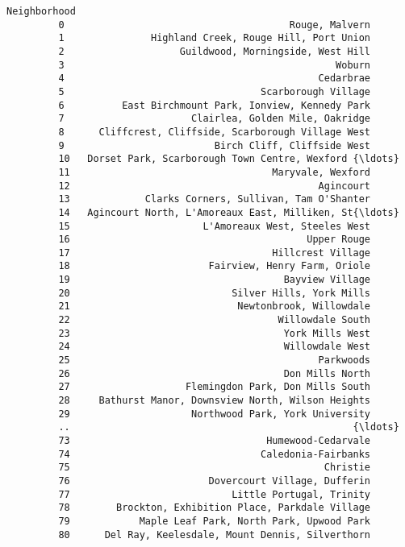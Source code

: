 \documentclass[11pt]{article}
\begin{document}
\begin{Verbatim}[commandchars=\\\{\}]
                                                   Neighborhood  
         0                                       Rouge, Malvern  
         1               Highland Creek, Rouge Hill, Port Union  
         2                    Guildwood, Morningside, West Hill  
         3                                               Woburn  
         4                                            Cedarbrae  
         5                                  Scarborough Village  
         6          East Birchmount Park, Ionview, Kennedy Park  
         7                      Clairlea, Golden Mile, Oakridge  
         8      Cliffcrest, Cliffside, Scarborough Village West  
         9                          Birch Cliff, Cliffside West  
         10   Dorset Park, Scarborough Town Centre, Wexford {\ldots}  
         11                                   Maryvale, Wexford  
         12                                           Agincourt  
         13             Clarks Corners, Sullivan, Tam O'Shanter  
         14   Agincourt North, L'Amoreaux East, Milliken, St{\ldots}  
         15                       L'Amoreaux West, Steeles West  
         16                                         Upper Rouge  
         17                                   Hillcrest Village  
         18                        Fairview, Henry Farm, Oriole  
         19                                     Bayview Village  
         20                            Silver Hills, York Mills  
         21                             Newtonbrook, Willowdale  
         22                                    Willowdale South  
         23                                     York Mills West  
         24                                     Willowdale West  
         25                                           Parkwoods  
         26                                     Don Mills North  
         27                    Flemingdon Park, Don Mills South  
         28     Bathurst Manor, Downsview North, Wilson Heights  
         29                     Northwood Park, York University  
         ..                                                 {\ldots}  
         73                                  Humewood-Cedarvale  
         74                                 Caledonia-Fairbanks  
         75                                            Christie  
         76                        Dovercourt Village, Dufferin  
         77                            Little Portugal, Trinity  
         78        Brockton, Exhibition Place, Parkdale Village  
         79            Maple Leaf Park, North Park, Upwood Park  
         80      Del Ray, Keelesdale, Mount Dennis, Silverthorn  

\end{Verbatim}
\end{document}
